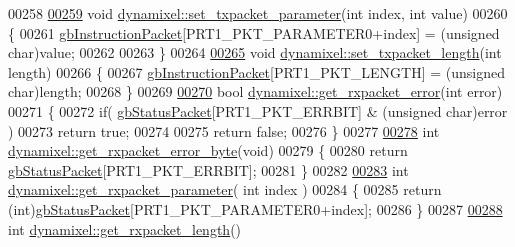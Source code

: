 \begin{DoxyCode}
00258 
\hypertarget{a00012_source_l00259}{}\hyperlink{a00003_a2c3d31bbbed70a69918e9972a620384b}{00259} \textcolor{keywordtype}{void} \hyperlink{a00003_a2c3d31bbbed70a69918e9972a620384b}{dynamixel::set\_txpacket\_parameter}(\textcolor{keywordtype}{int} index, \textcolor{keywordtype}{int} value)
00260 \{
00261     \hyperlink{a00003_afd94dcf01b8e96298727776e222de722}{gbInstructionPacket}[PRT1\_PKT\_PARAMETER0+index] = (\textcolor{keywordtype}{unsigned} char)value;
00262 
00263 \}
00264 
\hypertarget{a00012_source_l00265}{}\hyperlink{a00003_a829278f48e21c810b172eb8cab3b86de}{00265} \textcolor{keywordtype}{void} \hyperlink{a00003_a829278f48e21c810b172eb8cab3b86de}{dynamixel::set\_txpacket\_length}(\textcolor{keywordtype}{int} length)
00266 \{
00267     \hyperlink{a00003_afd94dcf01b8e96298727776e222de722}{gbInstructionPacket}[PRT1\_PKT\_LENGTH] = (\textcolor{keywordtype}{unsigned} char)length;
00268 \}
00269 
\hypertarget{a00012_source_l00270}{}\hyperlink{a00003_a843b0aac721e4264e7e3097f80980243}{00270} \textcolor{keywordtype}{bool}  \hyperlink{a00003_a843b0aac721e4264e7e3097f80980243}{dynamixel::get\_rxpacket\_error}(\textcolor{keywordtype}{int} error)
00271 \{
00272     \textcolor{keywordflow}{if}( \hyperlink{a00003_aa57c86d3bbbeaf5c9d4f6bd00376b04f}{gbStatusPacket}[PRT1\_PKT\_ERRBIT] & (\textcolor{keywordtype}{unsigned} \textcolor{keywordtype}{char})error )
00273         \textcolor{keywordflow}{return} \textcolor{keyword}{true};
00274 
00275     \textcolor{keywordflow}{return} \textcolor{keyword}{false};
00276 \}
00277 
\hypertarget{a00012_source_l00278}{}\hyperlink{a00003_a6e62341ef9f51b6e152e769bd7be9d75}{00278} \textcolor{keywordtype}{int} \hyperlink{a00003_a6e62341ef9f51b6e152e769bd7be9d75}{dynamixel::get\_rxpacket\_error\_byte}(\textcolor{keywordtype}{void})
00279 \{
00280     \textcolor{keywordflow}{return} \hyperlink{a00003_aa57c86d3bbbeaf5c9d4f6bd00376b04f}{gbStatusPacket}[PRT1\_PKT\_ERRBIT];
00281 \}
00282 
\hypertarget{a00012_source_l00283}{}\hyperlink{a00003_a68b5fa99719a9aec0734ecfb0635503b}{00283} \textcolor{keywordtype}{int}  \hyperlink{a00003_a68b5fa99719a9aec0734ecfb0635503b}{dynamixel::get\_rxpacket\_parameter}( \textcolor{keywordtype}{int} index )
00284 \{
00285     \textcolor{keywordflow}{return} (\textcolor{keywordtype}{int})\hyperlink{a00003_aa57c86d3bbbeaf5c9d4f6bd00376b04f}{gbStatusPacket}[PRT1\_PKT\_PARAMETER0+index];
00286 \}
00287 
\hypertarget{a00012_source_l00288}{}\hyperlink{a00003_ae9cc18fdeda8329f68fa0f2f0a7a9aba}{00288} \textcolor{keywordtype}{int}  \hyperlink{a00003_ae9cc18fdeda8329f68fa0f2f0a7a9aba}{dynamixel::get\_rxpacket\_length}()

\end{DoxyCode}
